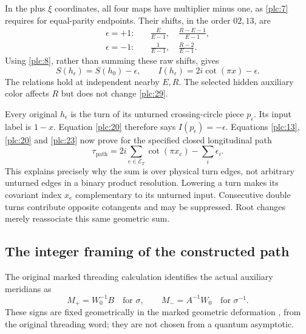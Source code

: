 In the plus \(\xi\) coordinates, all four maps have multiplier minus
one, as \eqref{plc:7} requires for equal-parity endpoints. Their shifts, in the
order \(02,13\), are \begin{equation}
\begin{aligned}
\epsilon=+1:\quad&
  \frac E{E-1},\quad\frac{R-E-1}{E-1},\\
\epsilon=-1:\quad&
  \frac1{E-1},\quad\frac{R-2}{E-1}.
\end{aligned}
\label{plc:28}
\end{equation} Using \eqref{plc:8}, rather than summing these raw shifts, gives \begin{equation}
S(h_\epsilon)=S(h_0)-\epsilon,\qquad
                  I(h_\epsilon)=2i\cot(\pi x)-\epsilon.
\label{plc:29}
\end{equation} The relations hold at independent nearby \(E,R\). The selected hidden
auxiliary color affects \(R\) but does not change \eqref{plc:29}.

Every original \(h_\epsilon\) is the turn of its unturned
crossing-circle piece \(p_\epsilon\). Its input label is \(1-x\).
Equation \eqref{plc:20} therefore says \(I(p_\epsilon)=-\epsilon\). Equations
\eqref{plc:13}, \eqref{plc:20} and \eqref{plc:23} now prove for the specified closed longitudinal path
\begin{equation}
\tau_{\mathrm{path}}
        =2i\sum_{e\in\mathcal E_T}\cot(\pi x_e)-\sum_i\epsilon_i.
\label{plc:30}
\end{equation} This explains precisely why the sum is over physical turn edges, not
arbitrary unturned edges in a binary product resolution. Lowering a turn
makes its covariant index \(x_e\) complementary to its unturned input.
Consecutive double turns contribute opposite cotangents and may be
suppressed. Root changes merely reassociate this same geometric sum.

\subsection{The integer framing of the constructed
path}\label{the-integer-framing-of-the-constructed-path}

The original marked threading calculation identifies the actual
auxiliary meridians as \begin{equation}
M_+=W_0^{-1}B\quad\text{for }\sigma,\qquad
 M_-=A^{-1}W_0\quad\text{for }\sigma^{-1}.
\label{plc:31}
\end{equation} These signs are fixed geometrically in the marked geometric
deformation \cite[Sections 5 and 8]{StrictGeometry}, from the original threading word; they are not
chosen from a quantum asymptotic.

